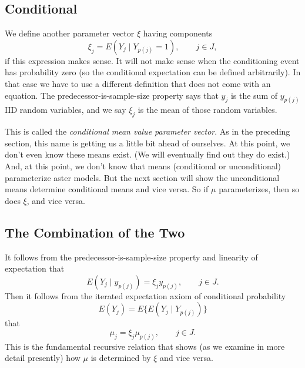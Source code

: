 \subsection{Conditional}
\label{sec:xi}

We define another parameter vector $\xi$ having components
\begin{equation} \label{eq:conditional-mean-values}
   \xi_j = E(Y_j \mid Y_{p(j)} = 1), \qquad j \in J,
\end{equation}
if this expression makes sense.  It will not make sense when the
conditioning event has probability zero (so the conditional expectation
can be defined arbitrarily).  In that case we have to use a different
definition that does not come with an equation.
The predecessor-is-sample-size property says that $y_j$ is the sum
of $y_{p(j)}$ IID random variables, and we say $\xi_j$ is the mean
of those random variables.

This is called the \emph{conditional mean value parameter vector}.
As in the preceding section, this name is getting us a little bit ahead
of ourselves.
At this point, we don't even know these means exist.
(We will eventually find out they do exist.)
And, at this point, we don't know that means (conditional or unconditional)
parameterize aster models.  But the next section will show the unconditional
means determine conditional means and vice versa.  So if $\mu$ parameterizes,
then so does $\xi$, and vice versa.

\subsection{The Combination of the Two}
\label{sec:mu-and-xi}

It follows from the predecessor-is-sample-size property and linearity of
expectation that
\begin{equation} \label{eq:cond-exp}
   E(Y_j \mid y_{p(j)}) = \xi_j y_{p(j)}, \qquad j \in J.
\end{equation}
Then it follows from the iterated expectation axiom of conditional probability
\begin{equation} \label{eq:iterated-expectation}
   E(Y_j)
   =
   E\{E(Y_j \mid Y_{p(j)})\}
\end{equation}
that
\begin{equation} \label{eq:mu-and-xi}
   \mu_j = \xi_j \mu_{p(j)}, \qquad j \in J.
\end{equation}
This is the fundamental recursive relation that shows (as we examine in
more detail presently) how $\mu$ is determined by $\xi$ and vice versa.


